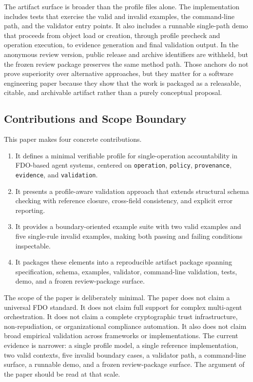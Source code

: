 The artifact surface is broader than the profile files alone. The implementation includes tests that exercise the valid and invalid examples, the command-line path, and the validator entry points. It also includes a runnable single-path demo that proceeds from object load or creation, through profile precheck and operation execution, to evidence generation and final validation output. In the anonymous review version, public release and archive identifiers are withheld, but the frozen review package preserves the same method path. Those anchors do not prove superiority over alternative approaches, but they matter for a software engineering paper because they show that the work is packaged as a releasable, citable, and archivable artifact rather than a purely conceptual proposal.

\subsection{Contributions and Scope Boundary}

This paper makes four concrete contributions.
\begin{enumerate}
\item It defines a minimal verifiable profile for single-operation accountability in FDO-based agent systems, centered on \texttt{operation}, \texttt{policy}, \texttt{provenance}, \texttt{evidence}, and \texttt{validation}.
\item It presents a profile-aware validation approach that extends structural schema checking with reference closure, cross-field consistency, and explicit error reporting.
\item It provides a boundary-oriented example suite with two valid examples and five single-rule invalid examples, making both passing and failing conditions inspectable.
\item It packages these elements into a reproducible artifact package spanning specification, schema, examples, validator, command-line validation, tests, demo, and a frozen review-package surface.
\end{enumerate}

The scope of the paper is deliberately minimal. The paper does not claim a universal FDO standard. It does not claim full support for complex multi-agent orchestration. It does not claim a complete cryptographic trust infrastructure, non-repudiation, or organizational compliance automation. It also does not claim broad empirical validation across frameworks or implementations. The current evidence is narrower: a single profile model, a single reference implementation, two valid contexts, five invalid boundary cases, a validator path, a command-line surface, a runnable demo, and a frozen review-package surface. The argument of the paper should be read at that scale.

